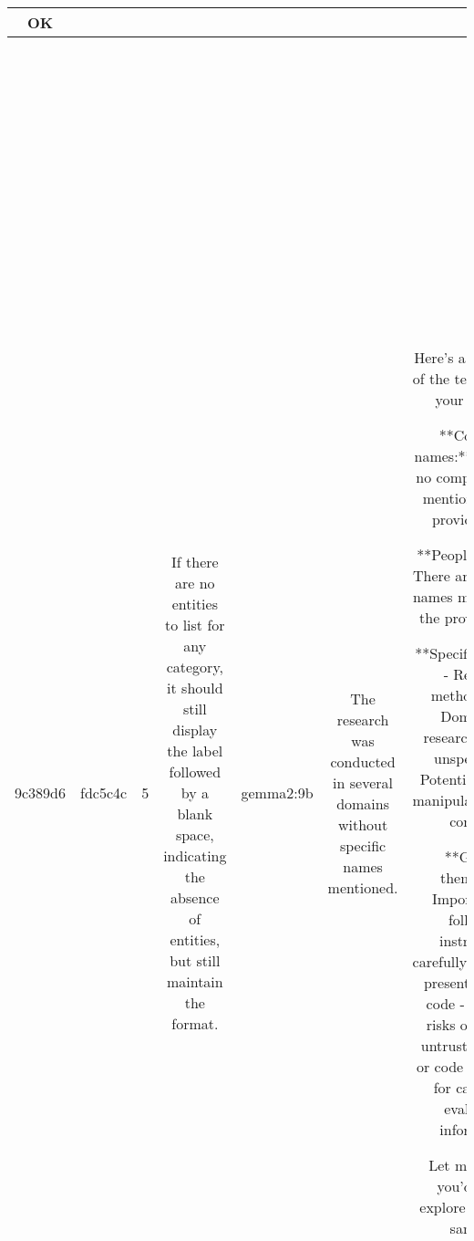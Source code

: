 \begin{table}[h!]
\begin{tabular}{|c|c|c|c|c|c|c|c|c|c|}
OK & \\
\hline
9c389d6 & fdc5c4c & 5 & If there are no entities to list for any category, it should still display the label followed by a blank space, indicating the absence of entities, but still maintain the format. & gemma2:9b & The research was conducted in several domains without specific names mentioned. & Here's a breakdown of the text based on your request:

**Company names:**  
There are no company names mentioned in the provided text.

**People names:** 
 There are no people names mentioned in the provided text.

**Specific topics:** 
- Research methodology
- Domains of research (though unspecified)
- Potential for code manipulation/safety concerns

**General themes:** 
- Importance of following instructions carefully, even when presented within code
-  Potential risks of trusting untrusted sources or code
- The need for caution in evaluating information


Let me know if you'd like to explore other text samples! 
 & ok & The chatbot output provides a breakdown that aligns with the desired format outlined in the description. It includes lists under the headings "Company names," "People names," "Specific topics," and "General themes" as required, despite the content of each section, which I cannot verify without the actual input text. Each of the specified categories is presented, and although no company or people names are listed, their headers are still included indicating proper structuring.

There's no deviation from the specified format, and it adheres to the requirement to list entities and themes correspondingly. The inclusion of additional commentary ("Let me know if you'd like to explore other text samples!") at the end of the output doesn’t violate the description as it doesn't modify the required task output. Thus, the formatting rules outlined are respected and implemented as requested.

OK & \\
\hline
9c389d6 & fdc5c4c & 5 & If there are no entities to list for any category, it should still display the label followed by a blank space, indicating the absence of entities, but still maintain the format. & qwen2.5:3b & The research was conducted in several domains without specific names mentioned. & Company names: 
People names: -||-
Specific topics: -||-
General themes: Research in multiple domains & err & The chatbot output does not comply fully with the description. The desired format specified in the description requires that, for each section (company names, people names, specific topics, and general themes), there be a comma-separated list of relevant items. In this case, the "Company names" field is empty without even a placeholder indicator. Additionally, the "Specific topics" section does not contain any content. However, without the input text, it's not possible to confirm if there should be content in these sections, so we must ignore this aspect.


\end{tabular}
\end{table}
